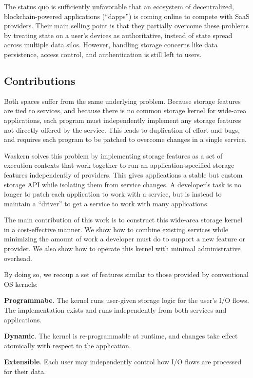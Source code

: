 The status quo is sufficiently unfavorable that an ecosystem of decentralized,
blockchain-powered applications (``dapps'') is coming online to compete with SaaS
providers. Their main selling point is that they partially overcome these
problems by treating state on a user's devices as authoritative, instead of
state spread across multiple data silos. However, handling storage concerns
like data persistence, access control, and authentication is still left to
users.

\subsection{Contributions}

Both spaces suffer from the same underlying problem. Because storage features
are tied to services, and because there is no common storage kernel for
wide-area applications, each program must independently implement any storage
features not directly offered by the service.  This leads to duplication of
effort and bugs, and requires each program to be patched to overcome changes in
a single service.

Waskern solves this problem by implementing
storage features as a set of execution contexts that work together to run an 
application-specified storage features independently of providers.  This gives
applications a stable but
custom storage API while isolating them from service changes.  A
developer's task is no longer to patch each application to work with a
service, but is instead to maintain a ``driver'' to get a service to
work with many applications.

The main contribution of this work is to construct this
wide-area storage kernel in a cost-effective manner.  We show how to
combine existing services while minimizing the amount of work
a developer must do to support a new feature or provider.  We also show
how to operate this kernel with minimal administrative overhead.

By doing so, we recoup a set of features similar to those provided by
conventional OS kernels:

\textbf{Programmabe}. The kernel runs user-given storage logic for the user's
I/O flows.  The implementation exists and runs independently from both
services and applications.

\textbf{Dynamic}. The kernel is re-programmable at
runtime, and changes take effect atomically with respect to the application.

\textbf{Extensible}.  Each user may independently control how I/O flows are
processed for their data.

